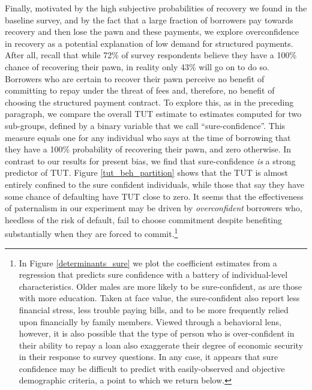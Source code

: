 \documentclass[12pt, a4paper]{article}
\begin{document}
Finally, motivated by the high subjective probabilities of recovery we found in the baseline survey, and by the fact that a large fraction of borrowers pay towards recovery and then lose the pawn and these payments, we explore overconfidence in recovery as a potential explanation of low demand for structured payments. After all, recall that while 72\% of survey respondents believe they have a 100\% chance of recovering their pawn, in reality only 43\% will go on to do so.  
Borrowers who are certain to recover their pawn perceive no benefit of committing to repay under the threat of fees and, therefore, no benefit of choosing the structured payment contract.
To explore this, as in the preceding paragraph, we compare the overall TUT estimate to estimates computed for two sub-groups, defined by a binary variable that we call ``sure-confidence''. This measure equals one for any individual who says at the time of borrowing that they have a 100\% probability of recovering their pawn, and zero otherwise.
In contrast to our results for present bias, we find that sure-confidence \textit{is} a strong predictor of TUT. Figure \ref{tut_beh_partition} shows that the TUT is almost entirely confined to the sure confident individuals, while those that say they have some chance of defaulting have TUT close to zero. It seems that the effectiveness of paternalism in our experiment may be driven by \emph{overconfident} borrowers who, heedless of the risk of default, fail to choose commitment despite benefiting substantially when they are forced to commit.\footnote{In Figure \ref{determinants_sure} we plot the coefficient estimates from a regression that predicts sure confidence with a battery of individual-level characteristics.  Older males are more likely to be sure-confident, as are those with more education.  Taken at face value, the sure-confident also report less financial stress, less trouble paying bills, and to be more frequently relied upon financially by family members.  Viewed through a behavioral lens, however, it is also possible that the type of person who is over-confident in their ability to repay a loan also exaggerate their degree of economic security in their response to survey questions. In any case, it appears that sure confidence may be difficult to predict with easily-observed and objective demographic criteria, a point to which we return below.}
\end{document}
